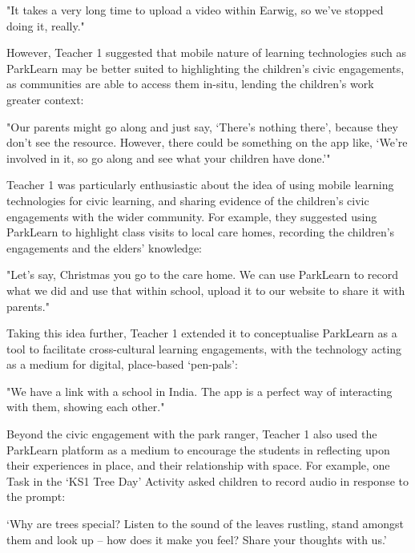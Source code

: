 \begin{displayquote}
"It takes a very long time to upload a video within Earwig, so we've stopped doing it, really."
\end{displayquote}

However, Teacher 1 suggested that mobile nature of learning technologies such as ParkLearn may be better suited to highlighting the children’s civic engagements, as communities are able to access them in-situ, lending the children's work greater context: 

\begin{displayquote}
"Our parents might go along and just say, `There's nothing there', because they don’t see the resource. However, there could be something on the app like, `We're involved in it, so go along and see what your children have done.'" 
\end{displayquote}

Teacher 1 was particularly enthusiastic about the idea of using mobile learning technologies for civic learning, and sharing evidence of the children's civic engagements with the wider community. For example, they suggested using ParkLearn to highlight class visits to local care homes, recording the children's engagements and the elders' knowledge: 

\begin{displayquote}
"Let’s say, Christmas you go to the care home. We can use ParkLearn to record what we did and use that within school, upload it to our website to share it with parents."
\end{displayquote}

Taking this idea further, Teacher 1 extended it to conceptualise ParkLearn as a tool to facilitate cross-cultural learning engagements, with the technology acting as a medium for digital, place-based `pen-pals': 

\begin{displayquote}
"We have a link with a school in India. The app is a perfect way of interacting with them, showing each other."
\end{displayquote}

Beyond the civic engagement with the park ranger, Teacher 1 also used the ParkLearn platform as a medium to encourage the students in reflecting upon their experiences in place, and their relationship with space. For example, one Task in the `KS1 Tree Day' Activity asked children to record audio in response to the prompt:

\begin{displayquote}
`Why are trees special? Listen to the sound of the leaves rustling, stand amongst them and look up – how does it make you feel? Share your thoughts with us.' 
\end{displayquote}

